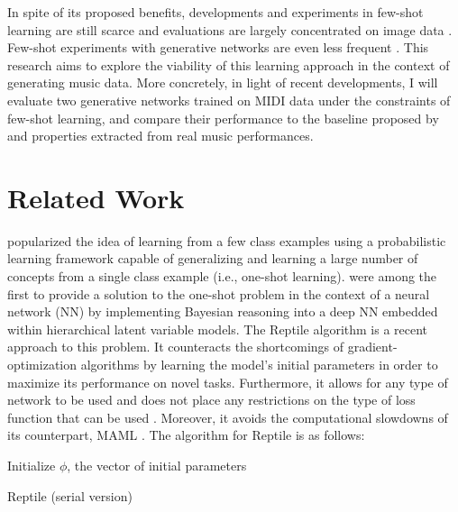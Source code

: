 \documentclass[11pt, a4paper, man, floatsintext]{apa6}
\begin{document}
In spite of its proposed benefits, developments and experiments in few-shot learning are still scarce \parencite{larochelle_few-shot_2017} and evaluations are largely concentrated on image data \parencite[e.g.,][]{lake_omniglot_2019, clouatre_figr_2019, chen_closer_2018}. Few-shot experiments with generative networks are even less frequent \parencite{zhang_metagan_2018, clouatre_figr_2019}. This research aims to explore the viability of this learning approach in the context of generating music data. More concretely, in light of recent developments, I will evaluate two generative networks trained on MIDI data under the constraints of few-shot learning, and compare their performance to the baseline proposed by \textcite{larochelle_few-shot_2017} and properties extracted from real music performances.

\section{Related Work}

\textcite{lake_human-level_2015} popularized the idea of learning from a few class examples using a probabilistic learning framework capable of generalizing and learning a large number of concepts from a single class example (i.e., one-shot learning). \textcite{rezende_one-shot_2016} were among the first to provide a solution to the one-shot problem in the context of a neural network (NN) by implementing Bayesian reasoning into a deep NN embedded within hierarchical latent variable models. The Reptile algorithm \parencite{nichol_first-order_2018} is a recent approach to this problem. It counteracts the shortcomings of gradient-optimization algorithms by learning the model's initial parameters in order to maximize its performance on novel tasks. Furthermore, it allows for any type of network to be used and does not place any restrictions on the type of loss function that can be used \parencite{nichol_first-order_2018}. Moreover, it avoids the computational slowdowns of its counterpart, MAML \parencite{finn_model-agnostic_2017}. The algorithm for Reptile is as follows:

\IncMargin{1em}
\begin{algorithm}
Initialize $\phi$, the vector of initial parameters


\caption{Reptile (serial version)}
\label{alg:reptile}
\end{algorithm}
\DecMargin{1em}
\end{document}
